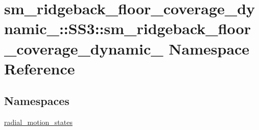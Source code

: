 \hypertarget{namespacesm__ridgeback__floor__coverage__dynamic__1_1_1SS3_1_1sm__ridgeback__floor__coverage__dynamic__1}{}\section{sm\+\_\+ridgeback\+\_\+floor\+\_\+coverage\+\_\+dynamic\+\_\+:\+:S\+S3\+:\+:sm\+\_\+ridgeback\+\_\+floor\+\_\+coverage\+\_\+dynamic\+\_ Namespace Reference}
\label{namespacesm__ridgeback__floor__coverage__dynamic__1_1_1SS3_1_1sm__ridgeback__floor__coverage__dynamic__1}
\subsection*{Namespaces}
\begin{DoxyCompactItemize}
\item 
 \hyperlink{namespacesm__ridgeback__floor__coverage__dynamic__1_1_1SS3_1_1sm__ridgeback__floor__coverage__dy219296fef47c7df87f40c37807cf3514}{radial\+\_\+motion\+\_\+states}
\end{DoxyCompactItemize}
